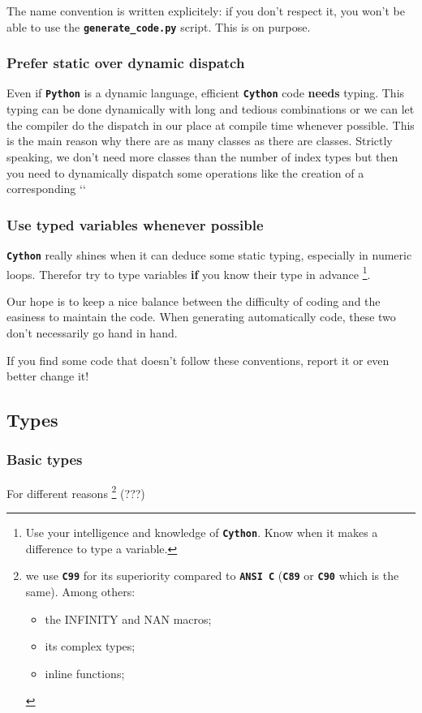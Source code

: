 \documentclass[letterpaper,10pt,english]{sphinxmanual}
\begin{document}
The name convention is written explicitely: if you don't respect it, you won't be able to use the \textbf{\texttt{generate\_code.py}} script. This is on purpose.


\subsubsection{Prefer static over dynamic dispatch}
\label{cysparse_lib_mainteners:prefer-static-over-dynamic-dispatch}
Even if \textbf{\texttt{Python}} is a dynamic language, efficient \textbf{\texttt{Cython}} code \textbf{needs} typing. This typing can be done dynamically with long and tedious  combinations or we can let the compiler
do the dispatch in our place at compile time whenever possible. This is the main reason why there are as many  classes as there are  classes. Strictly speaking, we don't need
more  classes than the number of index types but then you need to dynamically dispatch some operations like the creation of a corresponding {}`{}`


\subsubsection{Use typed variables whenever possible}
\label{cysparse_lib_mainteners:use-typed-variables-whenever-possible}
\textbf{\texttt{Cython}} really shines when it can deduce some static typing, especially in numeric loops. Therefor try to type variables \textbf{if} you know their type in advance \footnote{
Use your intelligence and knowledge of \textbf{\texttt{Cython}}. Know when it makes a difference to type a variable.
}.

Our hope is to keep a nice balance between the difficulty of coding and the easiness to maintain the code. When generating automatically code, these two don't necessarily go hand in hand.

If you find some code that doesn't follow these conventions, report it or even better change it!


\subsection{Types}
\label{cysparse_lib_mainteners:types}

\subsubsection{Basic types}
\label{cysparse_lib_mainteners:basic-types}
For different reasons \footnote{
we use \textbf{\texttt{C99}} for its superiority compared to \textbf{\texttt{ANSI C}} (\textbf{\texttt{C89}} or \textbf{\texttt{C90}} which is the same). Among others:
\begin{itemize}
\item {} 
the INFINITY and NAN macros;

\item {} 
its complex types;

\item {} 
inline functions;

\end{itemize}
} (???)
\end{document}
